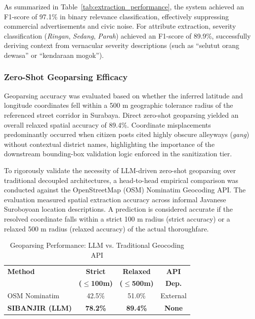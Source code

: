 \documentclass[conference]{IEEEtran}
\begin{document}
As summarized in Table~\ref{tab:extraction_performance}, the system achieved an F1-score of 97.1\% in binary relevance classification, effectively suppressing commercial advertisements and civic noise. For attribute extraction, severity classification (\textit{Ringan}, \textit{Sedang}, \textit{Parah}) achieved an F1-score of 89.9\%, successfully deriving context from vernacular severity descriptions (such as ``selutut orang dewasa'' or ``kendaraan mogok'').

\subsubsection{Zero-Shot Geoparsing Efficacy}
Geoparsing accuracy was evaluated based on whether the inferred latitude and longitude coordinates fell within a 500 m geographic tolerance radius of the referenced street corridor in Surabaya. Direct zero-shot geoparsing yielded an overall relaxed spatial accuracy of 89.4\%. Coordinate misplacements predominantly occurred when citizen posts cited highly obscure alleyways (\textit{gang}) without contextual district names, highlighting the importance of the downstream bounding-box validation logic enforced in the sanitization tier.

To rigorously validate the necessity of LLM-driven zero-shot geoparsing over traditional decoupled architectures, a head-to-head empirical comparison was conducted against the OpenStreetMap (OSM) Nominatim Geocoding API. The evaluation measured spatial extraction accuracy across informal Javanese Suroboyoan location descriptions. A prediction is considered accurate if the resolved coordinate falls within a strict 100 m radius (strict accuracy) or a relaxed 500 m radius (relaxed accuracy) of the actual thoroughfare.

\begin{table}[htbp]
\caption{Geoparsing Performance: LLM vs. Traditional Geocoding API}
\label{tab:geoparsing_comparison}
\centering
\small
\setlength{\tabcolsep}{3pt}
\begin{tabularx}{\columnwidth}{@{} >{\raggedright\arraybackslash}X c c c @{}}
\toprule
\textbf{Method} & \textbf{Strict} & \textbf{Relaxed} & \textbf{API} \\
 & \textbf{($\le$100m)} & \textbf{($\le$500m)} & \textbf{Dep.} \\
\midrule
OSM Nominatim & 42.5\% & 51.0\% & External \\
\textbf{SIBANJIR (LLM)} & \textbf{78.2\%} & \textbf{89.4\%} & \textbf{None} \\
\bottomrule
\end{tabularx}
\end{table}
\end{document}
